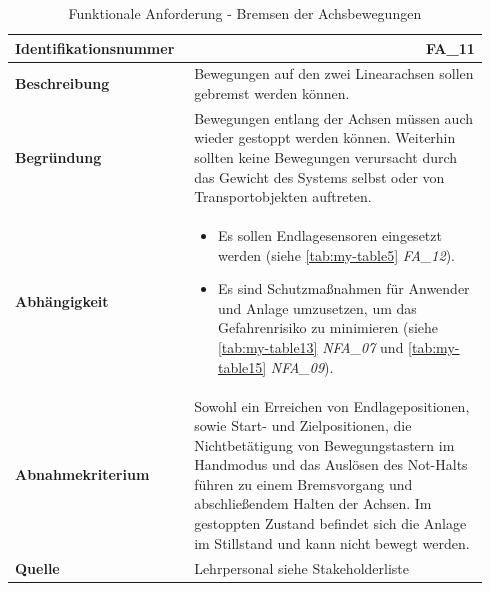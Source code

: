\documentclass[../../../Bachelorarbeit.tex]{subfiles}
\begin{document}
\begin{table}[H]
    \centering
    \begin{tabular}{ p{0.34\linewidth}  p{0.6\linewidth} }
        \hline
        \textbf{Identifikationsnummer}  & \multicolumn{1}{r}{FA\_11} \\ \hline
        \textbf{Beschreibung}           & Bewegungen auf den zwei Linearachsen sollen gebremst werden können. \\
        \textbf{Begründung}             & Bewegungen entlang der Achsen müssen auch wieder gestoppt werden können. Weiterhin sollten keine Bewegungen verursacht durch das Gewicht des Systems selbst oder von Transportobjekten auftreten. \\
        \textbf{Abhängigkeit}           &   {\begin{itemize}[noitemsep,topsep=0pt,parsep=0pt,partopsep=0pt,leftmargin=*]
                                                \item Es sollen Endlagesensoren eingesetzt werden (siehe \autoref{tab:my-table5} \textit{FA\_12}).
                                                \item Es sind Schutzmaßnahmen für Anwender und Anlage umzusetzen, um das Gefahrenrisiko zu minimieren (siehe \autoref{tab:my-table13} \textit{NFA\_07} und \autoref{tab:my-table15} \textit{NFA\_09}).
                                            \end{itemize}} \\
        \textbf{Abnahmekriterium}       & Sowohl ein Erreichen von Endlagepositionen, sowie Start- und Zielpositionen, die Nichtbetätigung von Bewegungstastern im Handmodus und das Auslösen des Not-Halts führen zu einem Bremsvorgang und abschließendem Halten der Achsen. Im gestoppten Zustand befindet sich die Anlage im Stillstand und kann nicht bewegt werden. \\
        \textbf{Quelle}                 & Lehrpersonal siehe Stakeholderliste \\ \hline
    \end{tabular}
    \caption[\acs{fa} - Bremsen der Achsbewegungen]{Funktionale Anforderung - Bremsen der Achsbewegungen}
    \label{tab:my-table4}
\end{table}
\end{document}
